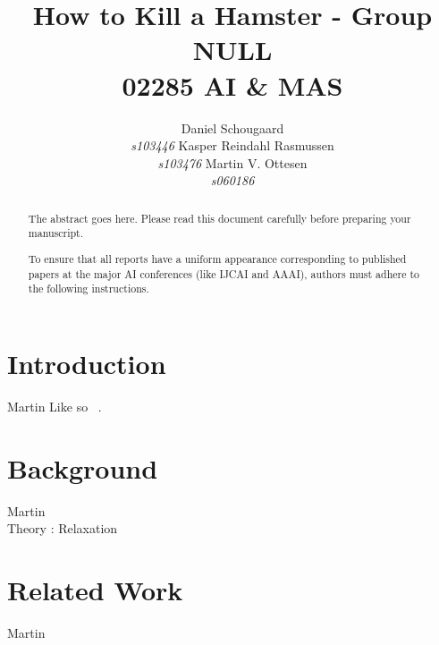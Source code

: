 \documentclass[letterpaper]{article}
\begin{document}
\title{How to Kill a Hamster - Group NULL\\ 02285 AI \& MAS}
\author{Daniel Schougaard \\ \textit{s103446} \And Kasper Reindahl Rasmussen\\ \textit{s103476} \And Martin V. Ottesen\\ \textit{s060186}}
\maketitle

\begin{abstract}
The abstract goes here. Please read this document carefully before preparing your manuscript.

To ensure that all reports have a uniform appearance corresponding to published papers at the major AI conferences (like IJCAI and AAAI), authors must adhere to the following instructions. 
\end{abstract}

\section{Introduction}
	Martin
	Like so ~\cite{Pukoban}. 
\section{Background}
	Martin\\
	Theory : Relaxation

\section{Related Work}
	Martin
\end{document}

